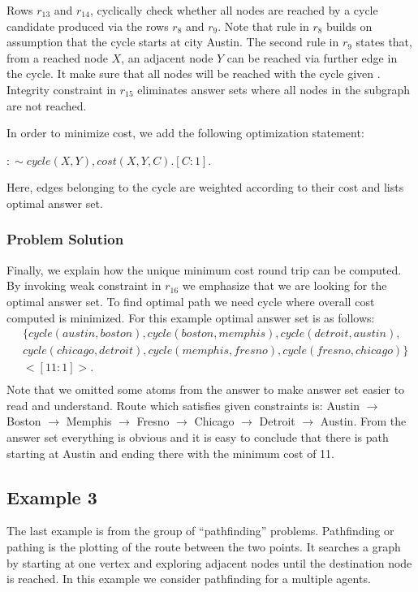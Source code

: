 \documentclass[a4paper, titlepage]{article}
\begin{document}
Rows $r_{13}$ and $r_{14}$, cyclically check whether all 
nodes 
are reached by a cycle candidate produced via the rows 
$r_8$ and $r_9$.  Note that rule in $r_8$ builds on 
assumption that the cycle starts at city Austin. The second 
rule in $r_9$ states that, from a reached node $X$, an 
adjacent node $Y$ can be reached via further edge in the 
cycle. It make sure that all nodes will be reached with the 
cycle given \cite{pott}. Integrity constraint in $r_{15}$ 
eliminates answer sets where all nodes in the subgraph are 
not reached.

In order to minimize cost, we add the following 
optimization statement: \\
\centerline{$:\sim cycle(X,Y), cost(X,Y,C). [C:1].$}
Here, edges belonging to the cycle are weighted according 
to their cost and \dlvhex{} lists optimal answer set.

\subsubsection{Problem Solution}
Finally, we explain how the unique minimum cost round trip 
can be computed. By invoking weak constraint in $r_{16}$ we  
emphasize that we are looking for the optimal answer set. 
To find optimal path we need cycle where overall cost 
computed is minimized. For this example optimal answer set 
is as follows:
\begin{align*}
& \{ cycle(austin,boston), 
cycle(boston,memphis),cycle(detroit,austin), \\
& cycle(chicago,detroit), 
cycle(memphis,fresno),cycle(fresno,chicago) \} \\
& <[11:1]>. \\
\end{align*}
Note that we omitted some atoms from the answer to make 
answer set easier to read and understand. Route which satisfies given constraints is: Austin $\rightarrow$ Boston $\rightarrow$ Memphis $\rightarrow$ Fresno $\rightarrow$ Chicago $\rightarrow$ Detroit $\rightarrow$ Austin.
From the answer set everything is obvious and it is easy to 
conclude that there is path starting at Austin and ending 
there with the minimum cost of 11. 




\subsection{Example 3}
\label{example3}
The last example is from the group of ``pathfinding'' problems. Pathfinding or pathing is the plotting of 
the route between the two points. It searches a 
graph by starting at one vertex and exploring adjacent 
nodes until the destination node is reached. In this 
example we consider pathfinding for a multiple agents.
 
\end{document}
